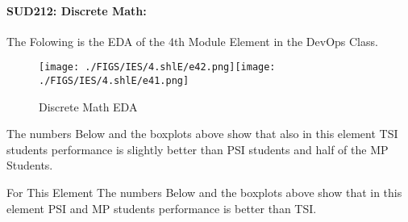\documentclass[12pt]{extreport}
\begin{document}

\paragraph{\large SUD212: Discrete Math:\\
} 
The Folowing is the EDA of the 4th Module Element in the DevOps Class.
\begin{figure}[H]
	\centering
	\texttt{[image: ./FIGS/IES/4.shlE/e42.png]}\texttt{[image: ./FIGS/IES/4.shlE/e41.png]}
	\caption{Discrete Math EDA}
	\label{fig:47}
\end{figure}

The numbers Below and the boxplots above show that also in this element  TSI students performance is slightly better than PSI students and half of the MP Students.

For This Element The numbers Below and the boxplots above show that in this element  PSI and MP students performance is  better than TSI.


\begin{comment}
\subparagraph{Interpretation of the Box-plots:}
For This Element 



\begin{enumerate}	
	\item The MP Class Box-Plot:
	\begin{enumerate}
		\item MAX = a {} {} {} {} {} {} {} {} UQ = b {} {} {} {} {} {} {} {} Median = c
		\item LQ = d {} {} {} {} {} {} {} {}  MIN =	l {} {} {} {} {} {} {} {}  IQR = e - f = g
	\end{enumerate}
	\item The PSI Class Box-Plot:
	\begin{enumerate}
		\item MAX = a {} {} {} {} {} {} {} {} UQ = b {} {} {} {} {} {} {} {} Median = c
		\item LQ = d {} {} {} {} {} {} {} {}  MIN =	e {} {} {} {} {} {} {} {} IQR = f - g = h	
	\end{enumerate}
	\item The TSI Class Box-Plot:
	\begin{enumerate}
		\item MAX = a {} {} {} {} {} {} {} {} UQ = b {} {} {} {} {} {} {} {} Median = c
		\item LQ = d {} {} {} {} {} {} {} {} MIN = e {} {} {} {} {} {} {} {} IQR = f - g = h	
	\end{enumerate}
\end{enumerate}




\subparagraph{Interpretation of the histogram:}
This Frequency Distribution is (Skeness) with the following descriptive statistics:
\begin{enumerate}
	\item Mean = 
	\item STD = 
	\item Range = a - b = c
	\item IQR = a-b = c 
\end{enumerate}
\end{comment}
\end{document}
